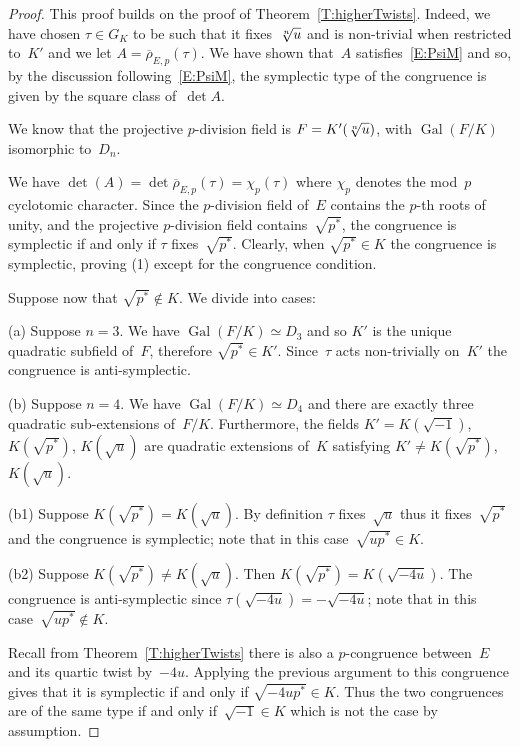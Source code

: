 \documentclass[twoside,leqno,symbols-for-thanks, draft]{rmi}
\numberwithin{equation}{section}
\newcommand{\rhobar}{{\overline{\rho}}}
\DeclareMathOperator{\Gal}{Gal}
\theoremstyle{remark}
\begin{document}
\begin{proof}
This proof builds on the proof of Theorem~\ref{T:higherTwists}.
Indeed, we have chosen $\tau\in G_K$ to be such that it fixes~$\root n\of u$ and 
is non-trivial when restricted to~$K'$ and 
we let $A = \rhobar_{E,p}(\tau)$. We have shown that~$A$ satisfies~\eqref{E:PsiM} and so, by the discussion following~\eqref{E:PsiM}, 
the symplectic type of the congruence is given by the square class of~$\det A$. 

We know that the projective $p$-division field is $F = K'(\root n \of
u)$, with $\Gal(F/K)$ isomorphic to~$D_n$.

We have $\det(A)=\det\rhobar_{E,p}(\tau)=\chi_p(\tau)$ where $\chi_p$ denotes the mod~$p$ cyclotomic character.  Since 
the $p$-division field of~$E$ contains the $p$-th roots of unity, and
the projective $p$-division field contains~$\sqrt{p^*}$, the
congruence is symplectic 
if and only if $\tau$ fixes~$\sqrt{p^*}$.
Clearly, when $\sqrt{p^*}\in K$ the congruence is symplectic, proving (1) except for the congruence condition.

Suppose now that $\sqrt{p^*}\notin K$.
We divide into cases:

(a) Suppose $n=3$. 
We have $\Gal(F/K) \simeq D_3$ and so $K'$ is the unique quadratic subfield of~$F$, therefore $\sqrt{p^*} \in K'$. Since~$\tau$ acts non-trivially on~$K'$ the congruence is anti-symplectic.

(b) Suppose $n=4$. We have $\Gal(F/K) \simeq D_4$ and there are exactly three quadratic sub-extensions of~$F/K$.
Furthermore, the fields 
$K'=K(\sqrt{-1})$, $K(\sqrt{p^*})$, $K(\sqrt{u})$ 
are quadratic extensions of~$K$ satisfying
$K' \neq K(\sqrt{p^*})$, $K(\sqrt{u})$. 

(b1) Suppose $K(\sqrt{p^*})=K(\sqrt{u})$.
By definition $\tau$ fixes~$\sqrt{u}$ thus  it fixes~$\sqrt{p^*}$ and the congruence is symplectic; note that in this case~$\sqrt{up^*} \in K$. 
 
(b2) Suppose $K(\sqrt{p^*}) \neq K(\sqrt{u})$. Then
$K(\sqrt{p^*})=K(\sqrt{-4u})$.  The congruence is anti-symplectic
since $\tau(\sqrt{-4u}) = - \sqrt{-4u}$; note that in this
case~$\sqrt{up^*} \not\in K$.

Recall from Theorem~\ref{T:higherTwists} there is also a
$p$-congruence between~$E$ and its quartic twist by~$-4u$. Applying
the previous argument to this congruence  gives that it is symplectic
if and only
if $\sqrt{-4up^*} \in K$. Thus the two congruences are of the same type if and only if~$\sqrt{-1} \in K$ which is not the case by assumption.


\end{proof}
\end{document}
